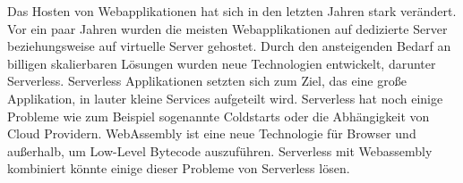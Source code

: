 Das Hosten von Webapplikationen hat sich in den letzten Jahren stark verändert. Vor ein paar Jahren wurden die meisten Webapplikationen auf dedizierte Server beziehungsweise auf virtuelle Server gehostet. Durch den ansteigenden Bedarf an billigen skalierbaren Lösungen wurden neue Technologien entwickelt, darunter Serverless. Serverless Applikationen setzten sich zum Ziel, das eine große Applikation, in lauter kleine Services aufgeteilt wird. Serverless hat noch einige Probleme wie zum Beispiel sogenannte Coldstarts oder die Abhängigkeit von Cloud Providern. WebAssembly ist eine neue Technologie für Browser und außerhalb, um Low-Level Bytecode auszuführen. Serverless mit Webassembly kombiniert könnte einige dieser Probleme von Serverless lösen. 